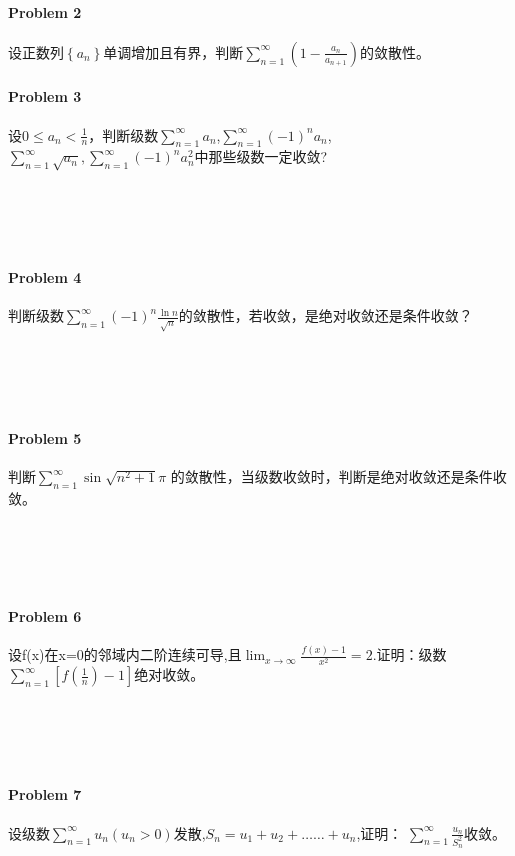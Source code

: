 \documentclass[12pt]{scrartcl}
\begin{document}
{\begin{enumerate}[label={[\Alph*]}]
\end{enumerate}

\paragraph*{Problem 2}
设正数列$\left\{a_n\right\}$单调增加且有界，判断$\sum_{n = 1}^{\infty} (1-\frac{a_n}{a_{n+1}} )$的敛散性。 

\paragraph*{Problem 3}
设$0\leq a_n<\frac{1}{n}$，判断级数$\sum_{n = 1}^{\infty} a_n$,$\sum_{n = 1}^{\infty} (-1)^n a_n$,
$\sum_{n = 1}^{\infty} \sqrt{a_n},\sum_{n = 1}^{\infty} (-1)^n a_n^2$中那些级数一定收敛?   
\\
\\
\\
\\
\\
\paragraph*{Problem 4}
判断级数$\sum_{n = 1}^{\infty} (-1)^n \frac{\ln n}{\sqrt{n} }$的敛散性，若收敛，是绝对收敛还是条件收敛？  
\\
\\
\\
\\
\\
\paragraph*{Problem 5}
判断$\sum_{n = 1}^{\infty} \sin \sqrt{n^2+1}\pi$ 的敛散性，当级数收敛时，判断是绝对收敛还是条件收敛。 
\\
\\
\\
\\
\\
\paragraph*{Problem 6}
设f(x)在x=0的邻域内二阶连续可导,且$\lim_{x \to \infty} \frac{f(x)-1}{x^2}=2$.证明：级数
$\sum_{n = 1}^{\infty} \left[f(\frac{1}{n})-1\right]$绝对收敛。    
\\
\\
\\
\\
\\
\paragraph*{Problem 7}
设级数$\sum_{n = 1}^{\infty} u_n (u_n>0) $发散,$S_n=u_1+u_2+……+u_n$,证明：
$\sum_{n = 1}^{\infty} \frac{u_n}{S_n^2}$收敛。  
\\
\\
\\
}
\end{document}
